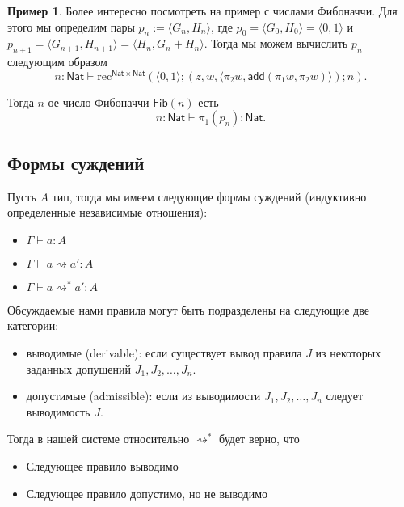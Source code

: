 \documentclass[openany]{book}
\theoremstyle{plain}
\theoremstyle{definition}
\newtheorem{eg}{Пример}[]
\newcommand{\rec}{\mathrm{rec}}
\newcommand{\nat}{\mathsf{Nat}}
\begin{document}
\begin{eg}
Более интересно посмотреть на пример с числами Фибоначчи. Для этого мы определим пары \(p_n := \langle G_n, H_n \rangle\), где \(p_0 = \langle G_0, H_0 \rangle = \langle 0, 1 \rangle\) и \(p_{n+1} = \langle G_{n+1}, H_{n+1} \rangle = \langle H_n, G_n + H_n \rangle\). Тогда мы можем вычислить \(p_n\) следующим образом \[n : \nat \vdash \rec^{\nat \times \nat} (\langle 0, 1 \rangle; (z, w, \langle \pi_2 w, \mathsf{add}(\pi_1 w, \pi_2 w)\rangle); n).\]

Тогда \(n\)-ое число Фибоначчи \(\mathsf{Fib}(n)\) есть \[n : \nat \vdash \pi_1(p_n) : \nat.\]
\end{eg}

\subsection{Формы суждений}

Пусть \(A\) тип, тогда мы имеем следующие формы суждений (индуктивно определенные независимые отношения):
\begin{itemize}
\item \(\Gamma \vdash a:A\)
\item \(\Gamma \vdash a \rightsquigarrow a':A\)
\item \(\Gamma \vdash a \rightsquigarrow^* a':A\)
\end{itemize}

Обсуждаемые нами правила могут быть подразделены на следующие две категории:

\begin{itemize}
\item выводимые (derivable): если существует вывод правила \(J\) из некоторых заданных допущений \(J_1, J_2, \dots, J_n\).
\item допустимые (admissible): если из выводимости \(J_1, J_2, \dots, J_n\) следует выводимость \(J\).
\end{itemize}

Тогда в нашей системе относительно \(\rightsquigarrow^*\) будет верно, что
\begin{itemize}
\item Следующее правило выводимо
\begin{prooftree}
\end{prooftree}

\item Следующее правило допустимо, но не выводимо
\begin{prooftree}
\end{prooftree}
\end{itemize}
\end{document}
